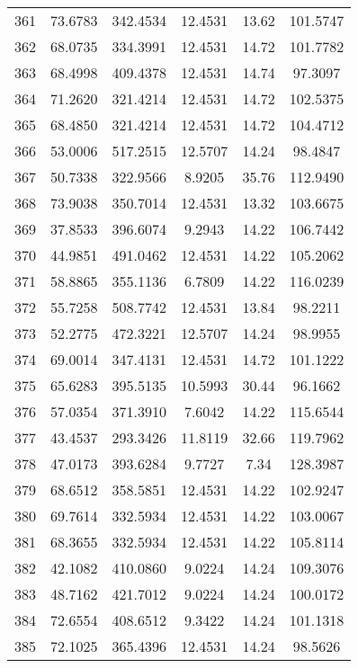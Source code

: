 \begin{center}
\begin{footnotesize}
\begin{tabular}{|c|ccccc|}
361 & 73.6783 & 342.4534 & 12.4531 & 13.62 & 101.5747 \\
362 & 68.0735 & 334.3991 & 12.4531 & 14.72 & 101.7782 \\
363 & 68.4998 & 409.4378 & 12.4531 & 14.74 & 97.3097 \\
364 & 71.2620 & 321.4214 & 12.4531 & 14.72 & 102.5375 \\
365 & 68.4850 & 321.4214 & 12.4531 & 14.72 & 104.4712 \\
366 & 53.0006 & 517.2515 & 12.5707 & 14.24 & 98.4847 \\
367 & 50.7338 & 322.9566 & 8.9205 & 35.76 & 112.9490 \\
368 & 73.9038 & 350.7014 & 12.4531 & 13.32 & 103.6675 \\
369 & 37.8533 & 396.6074 & 9.2943 & 14.22 & 106.7442 \\
370 & 44.9851 & 491.0462 & 12.4531 & 14.22 & 105.2062 \\
371 & 58.8865 & 355.1136 & 6.7809 & 14.22 & 116.0239 \\
372 & 55.7258 & 508.7742 & 12.4531 & 13.84 & 98.2211 \\
373 & 52.2775 & 472.3221 & 12.5707 & 14.24 & 98.9955 \\
374 & 69.0014 & 347.4131 & 12.4531 & 14.72 & 101.1222 \\
375 & 65.6283 & 395.5135 & 10.5993 & 30.44 & 96.1662 \\
376 & 57.0354 & 371.3910 & 7.6042 & 14.22 & 115.6544 \\
377 & 43.4537 & 293.3426 & 11.8119 & 32.66 & 119.7962 \\
378 & 47.0173 & 393.6284 & 9.7727 & 7.34 & 128.3987 \\
379 & 68.6512 & 358.5851 & 12.4531 & 14.22 & 102.9247 \\
380 & 69.7614 & 332.5934 & 12.4531 & 14.22 & 103.0067 \\
381 & 68.3655 & 332.5934 & 12.4531 & 14.22 & 105.8114 \\
382 & 42.1082 & 410.0860 & 9.0224 & 14.24 & 109.3076 \\
383 & 48.7162 & 421.7012 & 9.0224 & 14.24 & 100.0172 \\
384 & 72.6554 & 408.6512 & 9.3422 & 14.24 & 101.1318 \\
385 & 72.1025 & 365.4396 & 12.4531 & 14.24 & 98.5626 \\
\hline
\end{tabular}
\end{footnotesize}
\end{center}

